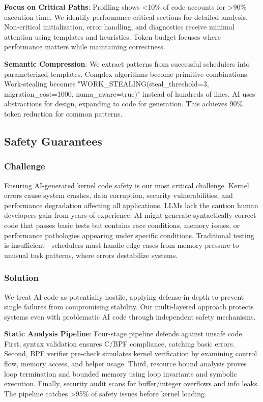 \textbf{Focus on Critical Paths}: Profiling shows <10\% of code accounts for >90\% execution time. We identify performance-critical sections for detailed analysis. Non-critical initialization, error handling, and diagnostics receive minimal attention using templates and heuristics. Token budget focuses where performance matters while maintaining correctness.

\textbf{Semantic Compression}: We extract patterns from successful schedulers into parameterized templates. Complex algorithms become primitive combinations. Work-stealing becomes "WORK\_STEALING(steal\_threshold=3, migration\_cost=1000, numa\_aware=true)" instead of hundreds of lines. AI uses abstractions for design, expanding to code for generation. This achieves 90\% token reduction for common patterns.

\subsection{Safety Guarantees}

\subsubsection{Challenge}
Ensuring AI-generated kernel code safety is our most critical challenge. Kernel errors cause system crashes, data corruption, security vulnerabilities, and performance degradation affecting all applications. LLMs lack the caution human developers gain from years of experience. AI might generate syntactically correct code that passes basic tests but contains race conditions, memory issues, or performance pathologies appearing under specific conditions. Traditional testing is insufficient—schedulers must handle edge cases from memory pressure to unusual task patterns, where errors destabilize systems.

\subsubsection{Solution}
We treat AI code as potentially hostile, applying defense-in-depth to prevent single failures from compromising stability. Our multi-layered approach protects systems even with problematic AI code through independent safety mechanisms.

\textbf{Static Analysis Pipeline}: Four-stage pipeline defends against unsafe code. First, syntax validation ensures C/BPF compliance, catching basic errors. Second, BPF verifier pre-check simulates kernel verification by examining control flow, memory access, and helper usage. Third, resource bound analysis proves loop termination and bounded memory using loop invariants and symbolic execution. Finally, security audit scans for buffer/integer overflows and info leaks. The pipeline catches >95\% of safety issues before kernel loading.

